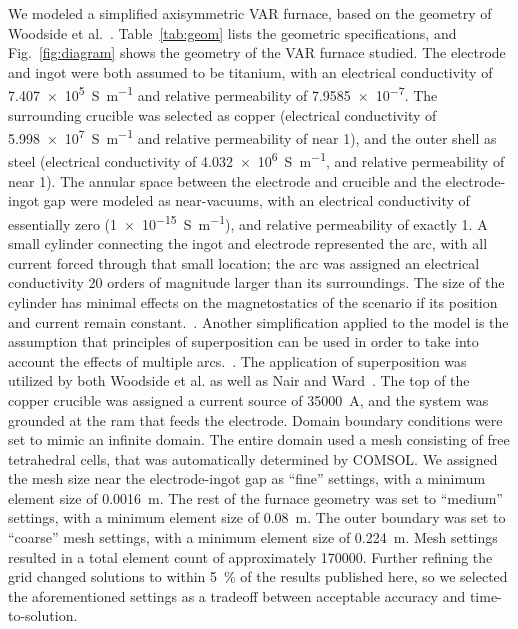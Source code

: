 \documentclass[onehalf,11pt]{beavtex}
\begin{document}
We modeled a simplified axisymmetric VAR furnace, based on the geometry of Woodside et al.~\cite{Woodside:2013cf}.
Table~\ref{tab:geom} lists the geometric specifications, and Fig.~\ref{fig:diagram} shows the geometry of the VAR furnace studied. 
The electrode and ingot were both assumed to be titanium, with an electrical conductivity of \SI{7.407e5}{\siemens\per\meter} and relative permeability of \SI{7.9585e-7}{}.
The surrounding crucible was selected as copper (electrical conductivity of \SI{5.998e7}{\siemens\per\meter} and relative permeability of near \SI{1}{}), and the outer shell as steel (electrical conductivity of \SI{4.032e6}{\siemens\per\meter}, and relative permeability of near \SI{1}{}).
The annular space between the electrode and crucible and the electrode-ingot gap were modeled as near-vacuums, with an electrical conductivity of essentially zero (\SI{1e-15}{\siemens\per\meter}), and relative permeability of exactly \SI{1}{}. 
A small cylinder connecting the ingot and electrode represented the arc, with all current forced through that small location; the arc was assigned an electrical conductivity 20 orders of magnitude larger than its surroundings. 
The size of the cylinder has minimal effects on the magnetostatics of the scenario if its position and current remain constant.~\cite{Nair:2009ja}.
Another simplification applied to the model is the assumption that principles of superposition can be used in order to take into account the effects of multiple arcs.~\cite{Woodside:2013cf}.
The application of superposition was utilized by both Woodside et al. as well as Nair and Ward~\cite{Woodside:2013cf,Nair:2009ja}.
The top of the copper crucible was assigned a current source of \SI{35000}{\ampere}, and the system was grounded at the ram that feeds the electrode. 
Domain boundary conditions were set to mimic an infinite domain.
The entire domain used a mesh consisting of free tetrahedral cells, that was automatically determined by COMSOL.
We assigned the mesh size near the electrode-ingot gap as ``fine'' settings, with a minimum element size of \SI{0.0016}{\meter}.
The rest of the furnace geometry was set to ``medium'' settings, with a minimum element size of \SI{0.08}{\meter}.
The outer boundary was set to ``coarse'' mesh settings, with a minimum element size of \SI{0.224}{\meter}.
Mesh settings resulted in a total element count of approximately \num{170000}.
Further refining the grid changed solutions to within \SI{5}{\percent} of the results published here, so we selected the aforementioned settings as a tradeoff between acceptable accuracy and time-to-solution.
\end{document}
